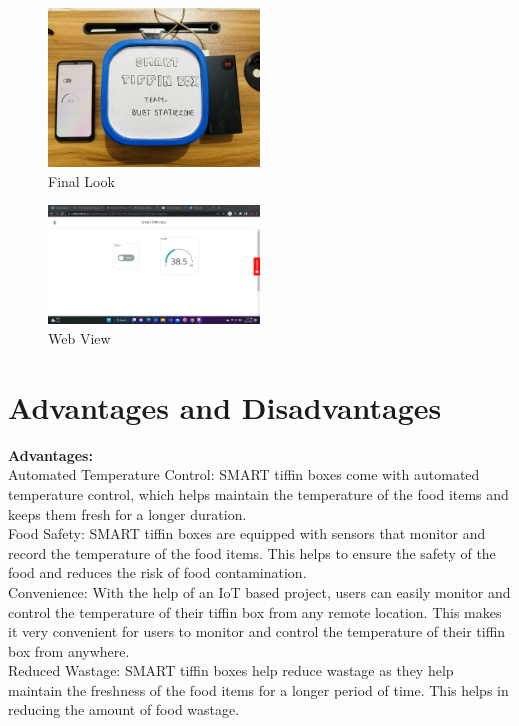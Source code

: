 \documentclass[conference]{IEEEtran}
\begin{document}
\begin{figure}[htbp]
\centerline{\includegraphics[width=0.5\textwidth, height=0.3\textwidth]{IMG_3511.jpg}}
\caption{Final Look}
\label{fig}
\end{figure}

\begin{figure}[htbp]
\centerline{\includegraphics[width=0.5\textwidth, height=0.3\textwidth]{web.png}}
\caption{Web View}
\label{fig}
\end{figure}

\section{Advantages and Disadvantages}
\textbf{Advantages:\\}
Automated Temperature Control: SMART tiffin boxes come with automated temperature control, which helps maintain the temperature of the food items and keeps them fresh for a longer duration.\\
Food Safety: SMART tiffin boxes are equipped with sensors that monitor and record the temperature of the food items. This helps to ensure the safety of the food and reduces the risk of food contamination.\\
Convenience: With the help of an IoT based project, users can easily monitor and control the temperature of their tiffin box from any remote location. This makes it very convenient for users to monitor and control the temperature of their tiffin box from anywhere.\\
Reduced Wastage: SMART tiffin boxes help reduce wastage as they help maintain the freshness of the food items for a longer period of time. This helps in reducing the amount of food wastage. \\
\end{document}

